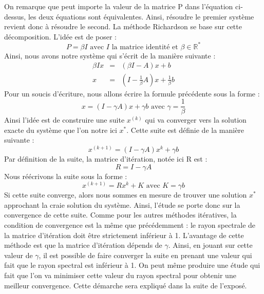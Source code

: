 On remarque que peut importe la valeur de la matrice P dans l'équation ci-dessus, les deux équations sont équivalentes. Ainsi, résoudre le premier système revient donc à résoudre le second. La méthode Richardson se base sur cette décomposition. L'idée est de poser : 
\begin{equation}
	P = \beta I \text{ avec $I$ la matrice identité et $\beta \in \mathbb{R}^*$}
\end{equation}
Ainsi, nous avons notre système qui s'écrit de la manière suivante : 
\begin{eqnarray}
\beta Ix &=& (\beta I - A)x + b\\
x &=& (I - \frac{1}{\beta} A)x + \frac{1}{\beta}b
\end{eqnarray}
Pour un soucis d'écriture, nous allons écrire la formule précédente sous la forme : 
\begin{equation}
x = (I - \gamma A)x + \gamma b \text{ avec $\gamma = \frac{1}{\beta}$}
\end{equation}
Ainsi l'idée est de construire une suite $x^{(k)}$ qui va converger vers la solution exacte du système que l'on notre ici $x^*$. Cette suite est définie de la manière suivante : 
\begin{equation}
x^{(k+1)} = (I - \gamma A)x^{k} + \gamma b
\end{equation}
Par définition de la suite, la matrice d'itération, notée ici R est : 
\begin{equation}
R = I - \gamma A \label{R}
\end{equation}
Nous réécrivons la suite sous la forme : 
\begin{equation}
x^{(k+1)} = Rx^{k} + K \text{ avec $K = \gamma b$}
\end{equation}
Si cette suite converge, alors nous sommes en mesure de trouver une solution $x^*$ approchant la craie solution du système. Ainsi, l'étude se porte donc sur la convergence de cette suite. Comme pour les autres méthodes itératives, la condition de convergence est la même que précédemment : le rayon spectrale de la matrice d'itération doit être strictement inférieur à 1. L'avantage de cette méthode est que la matrice d'itération dépends de $\gamma$. Ainsi, en jouant sur cette valeur de $\gamma$, il est possible de faire converger la suite en prenant une valeur qui fait que le rayon spectral est inférieur à 1. On peut même produire une étude qui fait que l'on va minimiser cette valeur du rayon spectral pour obtenir une meilleur convergence. Cette démarche sera expliqué dans la suite de l'exposé.
 
